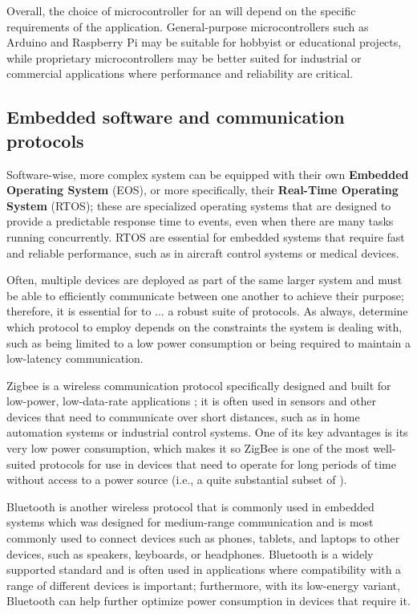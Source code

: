 Overall, the choice of microcontroller for an \es will depend on the specific requirements of the application. General-purpose microcontrollers such as Arduino and Raspberry Pi may be suitable for hobbyist or educational projects, while proprietary microcontrollers may be better suited for industrial or commercial applications where performance and reliability are critical.


\subsection{Embedded software and communication protocols}
Software-wise, more complex system can be equipped with their own \textbf{Embedded Operating System} (EOS), or more specifically, their \textbf{Real-Time Operating System} (RTOS); these are specialized operating systems that are designed to provide a predictable response time to events, even when there are many tasks running concurrently. RTOS are essential for embedded systems that require fast and reliable performance, such as in aircraft control systems or medical devices.

Often, multiple devices are deployed as part of the same larger system and must be able to efficiently communicate between one another to achieve their purpose; therefore, it is essential for \ess to ... a robust suite of protocols.
As always, determine which protocol to employ depends on the constraints the system is dealing with, such as being limited to a low power consumption or being required to maintain a low-latency communication.

Zigbee is a wireless communication protocol specifically designed and built for low-power, low-data-rate applications \cite{Zigbee}; it is often used in sensors and other devices that need to communicate over short distances, such as in home automation systems or industrial control systems. One of its key advantages is its very low power consumption, which makes it so ZigBee is one of the most well-suited protocols for use in devices that need to operate for long periods of time without access to a power source (i.e., a quite substantial subset of \ess).

Bluetooth is another wireless protocol that is commonly used in embedded systems which was designed for medium-range communication and is most commonly used to connect devices such as phones, tablets, and laptops to other devices, such as speakers, keyboards, or headphones. Bluetooth is a widely supported standard and is often used in applications where compatibility with a range of different devices is important; furthermore, with its low-energy variant, Bluetooth can help further optimize power consumption in devices that require it.

